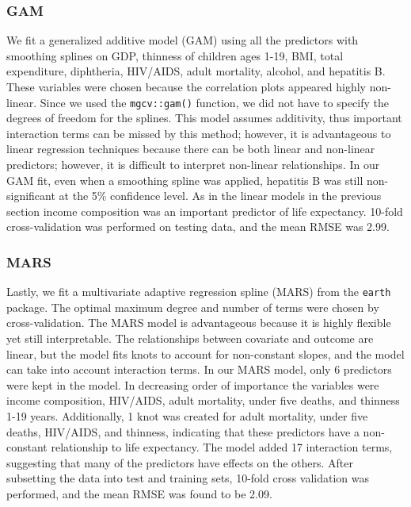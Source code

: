 \documentclass[]{article}
\begin{document}
\subsubsection{GAM}\label{gam}

We fit a generalized additive model (GAM) using all the predictors with
smoothing splines on GDP, thinness of children ages 1-19, BMI, total
expenditure, diphtheria, HIV/AIDS, adult mortality, alcohol, and
hepatitis B. These variables were chosen because the correlation plots
appeared highly non-linear. Since we used the \texttt{mgcv::gam()}
function, we did not have to specify the degrees of freedom for the
splines. This model assumes additivity, thus important interaction terms
can be missed by this method; however, it is advantageous to linear
regression techniques because there can be both linear and non-linear
predictors; however, it is difficult to interpret non-linear
relationships. In our GAM fit, even when a smoothing spline was applied,
hepatitis B was still non-significant at the 5\% confidence level. As in
the linear models in the previous section income composition was an
important predictor of life expectancy. 10-fold cross-validation was
performed on testing data, and the mean RMSE was 2.99.

\subsubsection{MARS}\label{mars}

Lastly, we fit a multivariate adaptive regression spline (MARS) from the
\texttt{earth} package. The optimal maximum degree and number of terms
were chosen by cross-validation. The MARS model is advantageous because
it is highly flexible yet still interpretable. The relationships between
covariate and outcome are linear, but the model fits knots to account
for non-constant slopes, and the model can take into account interaction
terms. In our MARS model, only 6 predictors were kept in the model. In
decreasing order of importance the variables were income composition,
HIV/AIDS, adult mortality, under five deaths, and thinness 1-19 years.
Additionally, 1 knot was created for adult mortality, under five deaths,
HIV/AIDS, and thinness, indicating that these predictors have a
non-constant relationship to life expectancy. The model added 17
interaction terms, suggesting that many of the predictors have effects
on the others. After subsetting the data into test and training sets,
10-fold cross validation was performed, and the mean RMSE was found to
be 2.09.
\end{document}
